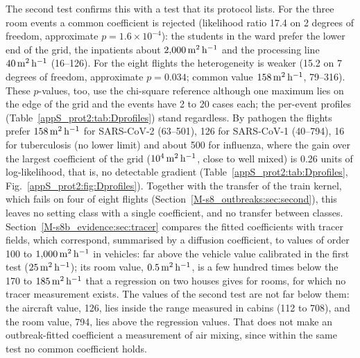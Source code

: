 The second test confirms this with a test that its protocol lists. For the three room events a common
coefficient is rejected (likelihood ratio 17.4 on 2 degrees of freedom, approximate $p=1.6\times10^{-4}$): the students in
the ward prefer the lower end of the grid, the inpatients about $2{,}000\,\mathrm{m}^2\,\mathrm{h}^{-1}$ and the processing line
$40\,\mathrm{m}^2\,\mathrm{h}^{-1}$ (16--126). For the eight flights the heterogeneity is weaker (15.2 on 7 degrees of freedom,
approximate $p=0.034$; common value $158\,\mathrm{m}^2\,\mathrm{h}^{-1}$, 79--316). These $p$-values, too, use the chi-square reference
although one maximum lies on the edge of the grid and the events have 2 to 20 cases each; the per-event
profiles (Table~\ref{appS_prot2:tab:Dprofiles}) stand regardless. By pathogen the flights prefer $158\,\mathrm{m}^2\,\mathrm{h}^{-1}$ for SARS-CoV-2
(63--501), 126 for SARS-CoV-1 (40--794), 16 for tuberculosis (no lower limit) and about 500 for influenza,
where the gain over the largest coefficient of the grid ($10^{4}\,\mathrm{m}^2\,\mathrm{h}^{-1}$, close to well mixed) is 0.26 units
of log-likelihood, that is, no detectable gradient
(Table~\ref{appS_prot2:tab:Dprofiles}, Fig.~\ref{appS_prot2:fig:Dprofiles}). Together with the transfer of
the train kernel, which fails on four of eight flights (Section~\ref{M-s8_outbreaks:sec:second}), this leaves
no setting class with a single coefficient, and no transfer between classes.
Section~\ref{M-s8b_evidence:sec:tracer} compares the fitted coefficients with tracer fields, which correspond,
summarised by a diffusion coefficient, to values of order 100 to $1{,}000\,\mathrm{m}^2\,\mathrm{h}^{-1}$ in vehicles: far above the
vehicle value calibrated in the first test ($25\,\mathrm{m}^2\,\mathrm{h}^{-1}$); its room value, $0.5\,\mathrm{m}^2\,\mathrm{h}^{-1}$, is a few hundred times
below the 170 to $185\,\mathrm{m}^2\,\mathrm{h}^{-1}$ that a regression on two houses gives for rooms, for which no tracer measurement
exists. The values of the second test are not far below them: the aircraft value, 126, lies inside the range
measured in cabins (112 to 708), and the room value, 794, lies above the regression values. That does not make
an outbreak-fitted coefficient a measurement of air mixing, since within the same test no common coefficient
holds.

